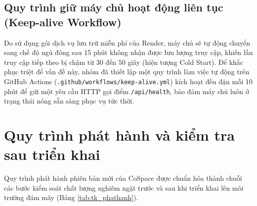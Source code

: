\subsection{Quy trình giữ máy chủ hoạt động liên tục (Keep-alive Workflow)}
Do sử dụng gói dịch vụ lưu trữ miễn phí của Render, máy chủ sẽ tự động chuyển sang chế độ ngủ đông sau 15 phút không nhận được lưu lượng truy cập, khiến lần truy cập tiếp theo bị chậm từ 30 đến 50 giây (hiện tượng Cold Start). Để khắc phục triệt để vấn đề này, nhóm đã thiết lập một quy trình làm việc tự động trên GitHub Actions (\texttt{.github/workflows/keep-alive.yml}) kích hoạt đều đặn mỗi 10 phút để gửi một yêu cầu HTTP gọi điểm \texttt{/api/health}, bảo đảm máy chủ luôn ở trạng thái nóng sẵn sàng phục vụ tức thời.

\section{Quy trình phát hành và kiểm tra sau triển khai}
\label{sec:tk_cicd}

Quy trình phát hành phiên bản mới của CoSpace được chuẩn hóa thành chuỗi các bước kiểm soát chất lượng nghiêm ngặt trước và sau khi triển khai lên môi trường đám mây (Bảng \ref{tab:tk_phathanh}).

